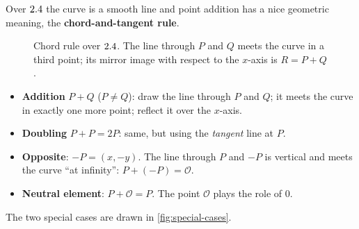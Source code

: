 Over $2.4$ the curve is a smooth line and point addition has a nice geometric meaning, the \textbf{chord-and-tangent rule}.

\begin{figure}[H]
  \centering
  \caption{Chord rule over $2.4$. The line through $P$ and $Q$ meets the curve in a third point; its mirror image with respect to the $x$-axis is $R = P + Q$.}
  \label{fig:chord}
\end{figure}

\begin{itemize}
  \item \textbf{Addition} $P + Q$ ($P \neq Q$): draw the line through $P$ and $Q$; it meets the curve in exactly one more point; reflect it over the $x$-axis.
  \item \textbf{Doubling} $P + P = 2P$: same, but using the \textit{tangent} line at $P$.
  \item \textbf{Opposite}: $-P = (x, -y)$. The line through $P$ and $-P$ is vertical and meets the curve ``at infinity'': $P + (-P) = \mathcal{O}$.
  \item \textbf{Neutral element}: $P + \mathcal{O} = P$. The point $\mathcal{O}$ plays the role of $0$.
\end{itemize}

The two special cases are drawn in \cref{fig:special-cases}.

